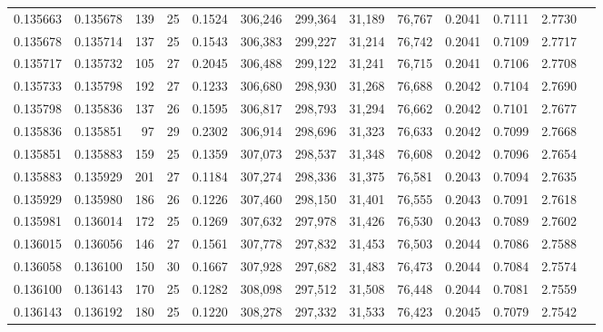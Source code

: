 \begin{tabular}{rrrrrrrrrrrrr}
0.135663 & 0.135678 & 139 &  25 &                                     0.1524 & 306,246 & 299,364 &  31,189 &  76,767 & 0.2041 & 0.7111 & 2.7730 \\
0.135678 & 0.135714 & 137 &  25 &                                     0.1543 & 306,383 & 299,227 &  31,214 &  76,742 & 0.2041 & 0.7109 & 2.7717 \\
0.135717 & 0.135732 & 105 &  27 &                                     0.2045 & 306,488 & 299,122 &  31,241 &  76,715 & 0.2041 & 0.7106 & 2.7708 \\
0.135733 & 0.135798 & 192 &  27 &                                     0.1233 & 306,680 & 298,930 &  31,268 &  76,688 & 0.2042 & 0.7104 & 2.7690 \\
0.135798 & 0.135836 & 137 &  26 &                                     0.1595 & 306,817 & 298,793 &  31,294 &  76,662 & 0.2042 & 0.7101 & 2.7677 \\
0.135836 & 0.135851 &  97 &  29 &                                     0.2302 & 306,914 & 298,696 &  31,323 &  76,633 & 0.2042 & 0.7099 & 2.7668 \\
0.135851 & 0.135883 & 159 &  25 &                                     0.1359 & 307,073 & 298,537 &  31,348 &  76,608 & 0.2042 & 0.7096 & 2.7654 \\
0.135883 & 0.135929 & 201 &  27 &                                     0.1184 & 307,274 & 298,336 &  31,375 &  76,581 & 0.2043 & 0.7094 & 2.7635 \\
0.135929 & 0.135980 & 186 &  26 &                                     0.1226 & 307,460 & 298,150 &  31,401 &  76,555 & 0.2043 & 0.7091 & 2.7618 \\
0.135981 & 0.136014 & 172 &  25 &                                     0.1269 & 307,632 & 297,978 &  31,426 &  76,530 & 0.2043 & 0.7089 & 2.7602 \\
0.136015 & 0.136056 & 146 &  27 &                                     0.1561 & 307,778 & 297,832 &  31,453 &  76,503 & 0.2044 & 0.7086 & 2.7588 \\
0.136058 & 0.136100 & 150 &  30 &                                     0.1667 & 307,928 & 297,682 &  31,483 &  76,473 & 0.2044 & 0.7084 & 2.7574 \\
0.136100 & 0.136143 & 170 &  25 &                                     0.1282 & 308,098 & 297,512 &  31,508 &  76,448 & 0.2044 & 0.7081 & 2.7559 \\
0.136143 & 0.136192 & 180 &  25 &                                     0.1220 & 308,278 & 297,332 &  31,533 &  76,423 & 0.2045 & 0.7079 & 2.7542 \\

\end{tabular}
